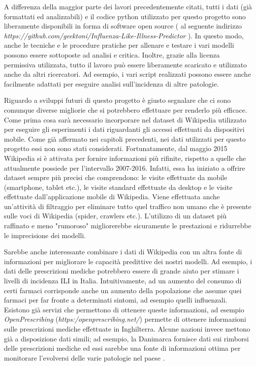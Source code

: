 A differenza della maggior parte dei lavori precedentemente citati, tutti i dati (già formattati ed analizzabili) e il codice 
python utilizzato per questo progetto sono liberamente disponibili in forma di software open source ( al seguente 
indirizzo \textit{https://github.com/geektoni/Influenza-Like-Illness-Predictor} ). In questo modo, 
anche le tecniche e le procedure pratiche per allenare e testare i vari modelli possono essere sottoposte ad analisi e 
critica. Inoltre, grazie alla licenza permissiva utilizzata, tutto il lavoro può essere liberamente scaricato e utilizzato 
anche da altri ricercatori. Ad esempio, i vari script realizzati possono essere anche facilmente adattati per eseguire
analisi sull'incidenza di altre patologie.
\bigskip

Riguardo a sviluppi futuri di questo progetto è giusto segnalare che ci sono comunque diverse migliorie che si potrebbero 
effettuare per renderlo più efficace. Come prima cosa sarà necessario incorporare nel dataset di 
Wikipedia utilizzato per eseguire gli esperimenti i dati riguardanti gli accessi effettuati da dispositivi mobile. 
Come già affermato nei capitoli precedenti, nei dati utilizzati per questo progetto essi non sono stati considerati. 
Fortunatamente, dal maggio 2015 Wikipedia si è attivata per fornire informazioni più rifinite, rispetto a quelle che 
attualmente possiede per l'intervallo 2007-2016. Infatti, essa ha iniziato a offrire dataset sempre più precisi che 
comprendono: le visite effettuate da mobile (smartphone, tablet etc.), le visite standard effettuate da desktop e le visite 
effettuate dall'applicazione mobile di Wikipedia. Viene effettuata anche un'attività di filtraggio per eliminare tutto quel 
traffico non umano che è presente sulle voci di Wikipedia (spider, crawlers etc.). L'utilizzo di un dataset più raffinato e 
meno "rumoroso" migliorerebbe sicuramente le prestazioni e ridurrebbe le imprecisione dei modelli. 
\bigskip

Sarebbe anche interessante combinare i dati di Wikipedia con un altra fonte di informazioni per migliorare le capacità 
predittive dei nostri modelli. Ad esempio, i dati delle prescrizioni mediche potrebbero essere di grande aiuto per stimare i 
livelli di incidenza ILI in Italia. Intuitivamente, ad un aumento del consumo di certi farmaci corrisponde anche un aumento 
della popolazione che assume quei farmaci per far fronte a determinati sintomi, ad esempio quelli influenzali. Esistono già 
servizi che permettono di ottenere queste informazioni, ad esempio \textit{OpenPrescribing} 
(\textit{https:/openprescribing.net/}) permette di ottenere informazioni sulle prescrizioni mediche effettuate in 
Inghilterra. Alcune nazioni invece mettono già a disposizione dati simili; ad esempio, la Danimarca fornisce dati sui 
rimborsi delle prescrizioni mediche ed essi sarebbe una fonte di informazioni ottima per monitorare l'evolversi delle varie 
patologie nel paese \cite{sigrun2012}.
\bigskip


